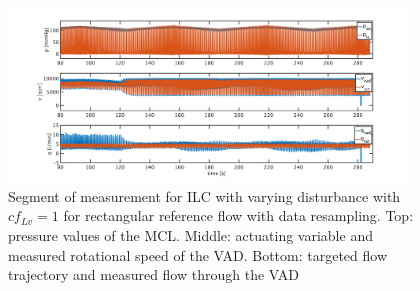 \begin{figure}[ht!]
  \centering
  \includegraphics[width=0.95\textwidth]{images/chapt_5/ILC/ilc_var_dist_fix_rect.pdf}
  \caption[Segment of measurement for ILC with varying disturbance with $cf_{Lv}=1$ for rectangular reference flow with data resampling]{Segment of measurement for ILC with varying disturbance with $cf_{Lv}=1$ for rectangular reference flow with data resampling. Top:  pressure values of the MCL. Middle: actuating variable and measured rotational speed of the VAD. Bottom: targeted flow trajectory and measured flow through the VAD}
   \label{fig:anh_14}
\end{figure}
